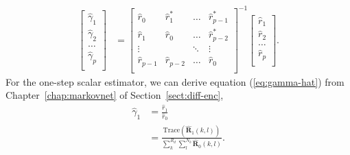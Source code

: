 \begin{align}
  \begin{bmatrix}
    \hat\gamma_{1} \\ \hat\gamma_{2} \\ \dots \\ \hat\gamma_{p} \\
  \end{bmatrix}
  &= 
  \begin{bmatrix}
    \hat r_{0} & \hat r_1^* & \dots  & \hat r_{p-1}^* \\
    \hat r_{1} & \hat r_0   & \dots  & \hat r_{p-2}^* \\
    \vdots      &         & \ddots & \vdots \\
    \hat r_{p-1} & \hat r_{p-2}   & \dots  & \hat r_{0} \\
  \end{bmatrix}^{-1}
  \begin{bmatrix}
    \hat r_{1} \\ \hat r_{2} \\ \dots \\ \hat r_{p} \\
  \end{bmatrix}. \label{eq:toep-sol-scalar-est}
\end{align}
For the one-step scalar estimator, we can derive equation (\ref{eq:gamma-hat}) from Chapter~\ref{chap:markovnet} of Section~\ref{sect:diff-enc},
\begin{align*}
  \hat{\gamma}_1 &= \frac{\hat{r}_1}{\hat{r}_0} \\
  &= \frac{\text{Trace}(\hat{\mathbf R}_1(k,l))}{\sum_k^{R_d}\sum_l^{N_b}\hat{\mathbf R}_0(k,l)}.
\end{align*}
